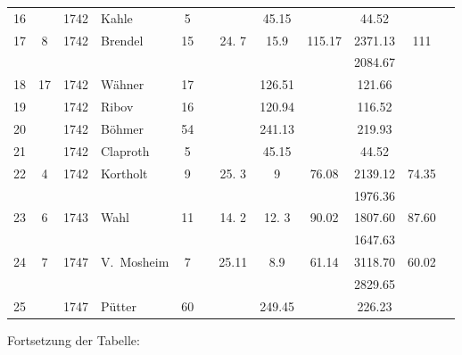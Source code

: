 \documentclass[12pt,a4paper]{article}
\begin{document}
\begin{center}
\begin{longtable}{|c|c|c|l|c|c|c|c|c|c|c|c|}
16 & & 1742 & Kahle & 5 & & & 45.15 & & 44.52 & \\
17 & 8 & 1742 & Brendel & 15 & & 24. 7 & 15.9 & 115.17 & 2371.13 & 111 \\
 & & & & & & & & & 2084.67 & \\
18 & 17 & 1742 & Wähner & 17 & & & 126.51 & & 121.66 & \\
19 & & 1742 & Ribov & 16 & & & 120.94 & & 116.52 & \\
20 & & 1742 & Böhmer & 54 & & & 241.13 & & 219.93 & \\
21 & & 1742 & Claproth & 5 & & & 45.15 & & 44.52 & \\
22 & 4 & 1742 & Kortholt & 9 & & 25. 3 & 9 & 76.08 & 2139.12 & 74.35 \\
 & & & & & & & & & 1976.36 & \\
23 & 6 & 1743 & Wahl & 11 & & 14. 2 & 12. 3 & 90.02 & 1807.60 & 87.60 \\
 & & & & & & & & & 1647.63 & \\
24 & 7 & 1747 & V.~Mosheim & 7 & & 25.11 & 8.9 & 61.14 & 3118.70 & 60.02 \\
 & & & & & & & & & 2829.65 & \\
25 & & 1747 & Pütter & 60 & & & 249.45 & & 226.23 & \\
\hline
\end{longtable}
\end{center}

Fortsetzung der Tabelle:
\end{document}

